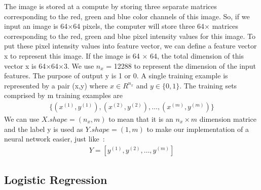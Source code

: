\documentclass[a4paper]{article}
\begin{document}
The image is stored at a compute by storing three separate matrices corresponding to the red, green and blue color channels of this image. So, if we input an image is 64$\times$64 pixels, the computer will store three 64$\times$ matrices corresponding to the red, green and blue pixel intensity values for this image. To put these pixel intensity values into feature vector, we can define a feature vector x to represent this image. If the image is 64 $\times$ 64, the total dimension of this vector x is 64$\times$64$\times$3. We use $n_x$ = 12288 to represent the dimension of the input features. The purpose of output y is 1 or 0. A single training example is represented by a pair (x,y) where $x\in R^{n_x}$ and $y \in \{0,1\}$. The training sets comprised by m training examples are~\cite{Neural}\\
\begin{gather}
\{(x^{(1)},y^{(1)}),(x^{(2)},y^{(2)}),\dots,(x^{(m)},y^{(m)})\}
\end{gather}
We can use $X.shape = (n_x,m)$ to mean that it is an $n_x\times m$ dimension matrice and the label y is used as $Y.shape = (1,m)$ to make our implementation of a neural network easier, just like~\cite{Neural}:\\
\begin{gather}
Y = [y^{(1)},y^{(2)},\dots,y^{(m)}]
\end{gather}

 \subsection{Logistic Regression}
\end{document}
